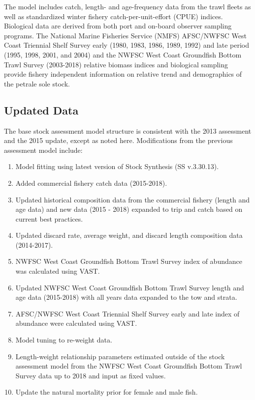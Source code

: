 \documentclass[12pt,]{article}
\begin{document}
The model includes catch, length- and age-frequency data from the trawl
fleets as well as standardized winter fishery catch-per-unit-effort
(CPUE) indices. Biological data are derived from both port and on-board
observer sampling programs. The National Marine Fisheries Service (NMFS)
AFSC/NWFSC West Coast Triennial Shelf Survey early (1980, 1983, 1986,
1989, 1992) and late period (1995, 1998, 2001, and 2004) and the NWFSC
West Coast Groundfish Bottom Trawl Survey (2003-2018) relative biomass
indices and biological sampling provide fishery independent information
on relative trend and demographics of the petrale sole stock.

\subsection*{Updated Data}\label{updated-data}

The base stock assessment model structure is consistent with the 2013
assessment and the 2015 update, except as noted here. Modifications from
the previous assessment model include:

\begin{enumerate}

\item Model fitting using latest version of Stock Synthesis (SS v.3.30.13). 

\item Added commercial fishery catch data (2015-2018).

\item Updated historical composition data from the commercial fishery (length and age data) and new data (2015 - 2018) expanded to trip and catch based on current best practices.

\item Updated discard rate, average weight, and discard length composition data (2014-2017).

\item NWFSC West Coast Groundfish Bottom Trawl Survey index of abundance was calculated using VAST.

\item Updated NWFSC West Coast Groundfish Bottom Trawl Survey length and age data (2015-2018) with all years data expanded to the tow and strata.

\item AFSC/NWFSC West Coast Triennial Shelf Survey early and late index of abundance were calculated using VAST.

\item Model tuning to re-weight data. 

\item Length-weight relationship parameters estimated outside of the stock assessment model from the NWFSC West Coast Groundfish Bottom Trawl Survey data up to 2018 and input as fixed values.

\item Update the natural mortality prior for female and male fish.

\end{enumerate}
\end{document}
